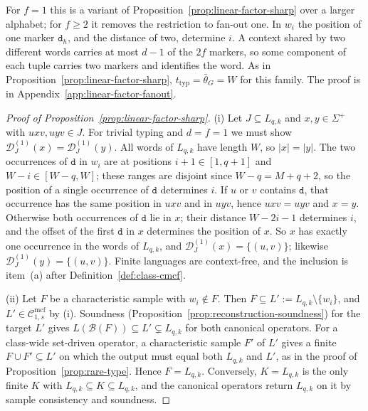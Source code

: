 \documentclass[11pt]{article}
\numberwithin{equation}{section}
\theoremstyle{plain}
\theoremstyle{definition}
\theoremstyle{remark}
\newcommand{\Cmcf}[2]{\mathcal{C}^{\mathrm{mcf}}_{#1,#2}}
\newcommand{\D}{\mathcal{D}}
\theoremstyle{plain}
\begin{document}
For $f=1$ this is a variant of Proposition~\ref{prop:linear-factor-sharp} over a
larger alphabet; for $f\ge2$ it removes the restriction to fan-out one.  In
$w_i$ the position of one marker $\mathtt d_h$, and the distance of two, determine
$i$.  A context shared by two different words carries at most $d-1$ of the $2f$
markers, so some component of each tuple carries two markers and identifies the
word.  As in Proposition~\ref{prop:linear-factor-sharp},
$t_{\mathrm{typ}}=\bar\theta_G=W$ for this family.  The proof is in
Appendix~\ref{app:linear-factor-fanout}.


\begin{proof}[Proof of Proposition~\ref{prop:linear-factor-sharp}]
(i) Let $J\subseteq L_{q,k}$ and $x,y\in\Sigma^+$ with $uxv,uyv\in J$.  For
trivial typing and $d=f=1$ we must show $\D_J^{(1)}(x)=\D_J^{(1)}(y)$.  All
words of $L_{q,k}$ have length $W$, so $|x|=|y|$.  The two occurrences of
$\mathtt d$ in $w_i$ are at positions $i+1\in[1,q+1]$ and
$W-i\in[W-q,W]$; these ranges are disjoint since $W-q=M+q+2$, so the
position of a single occurrence of $\mathtt d$ determines $i$.  If $u$ or $v$
contains $\mathtt d$, that occurrence has the same position in $uxv$ and in
$uyv$, hence $uxv=uyv$ and $x=y$.  Otherwise both occurrences of
$\mathtt d$ lie in $x$; their distance $W-2i-1$ determines $i$, and the
offset of the first $\mathtt d$ in $x$ determines the position of $x$.  So
$x$ has exactly one occurrence in the words of $L_{q,k}$, and
$\D_J^{(1)}(x)=\{(u,v)\}$; likewise $\D_J^{(1)}(y)=\{(u,v)\}$.  Finite
languages are context-free, and the inclusion is item~(a) after
Definition~\ref{def:class-cmcf}.

(ii) Let $F$ be a characteristic sample with $w_i\notin F$.  Then
$F\subseteq L':=L_{q,k}\setminus\{w_i\}$, and $L'\in\Cmcf{1}{s}$ by (i).
Soundness (Proposition~\ref{prop:reconstruction-soundness}) for the target
$L'$ gives $L(\mathcal B(F))\subseteq L'\subsetneq L_{q,k}$ for both canonical
operators.  For a class-wide set-driven operator, a characteristic sample
$F'$ of $L'$ gives a finite $F\cup F'\subseteq L'$ on which the output must
equal both $L_{q,k}$ and $L'$, as in the proof of
Proposition~\ref{prop:rare-type}.  Hence $F=L_{q,k}$.  Conversely,
$K=L_{q,k}$ is the only finite $K$ with $L_{q,k}\subseteq K\subseteq L_{q,k}$,
and the canonical operators return $L_{q,k}$ on it by sample consistency and
soundness.


\end{proof}
\end{document}
